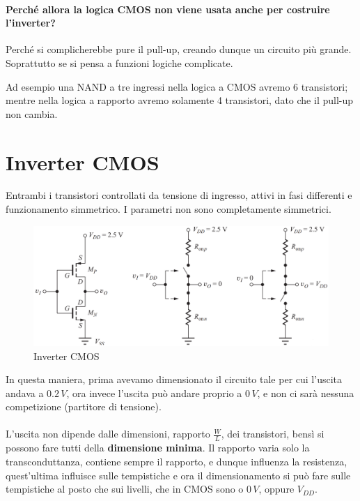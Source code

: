 \paragraph{Perché allora la logica CMOS non viene usata anche per costruire l'inverter?} Perché si complicherebbe pure il pull-up, creando dunque un circuito più grande. Soprattutto se si pensa a funzioni logiche complicate.

Ad esempio una NAND a tre ingressi nella logica a CMOS avremo 6 transistori; mentre nella logica a rapporto avremo solamente 4 transistori, dato che il pull-up non cambia.

\newpage
\section{Inverter CMOS}

Entrambi i transistori controllati da	tensione di	ingresso, attivi in fasi differenti e funzionamento simmetrico. I parametri non sono completamente simmetrici.


\begin{figure}[htbp]
    \centering
    \includegraphics[width=0.65\linewidth]{img/inveerrter_CMOS.png}
    \caption{Inverter CMOS}
    \label{Inverter_cmos}
\end{figure}

In questa maniera, prima avevamo dimensionato il circuito tale per cui l'uscita andava a $0.2\,V$, ora invece l'uscita può andare proprio a $0\,V$, e non ci sarà nessuna competizione (partitore di tensione).

\paragraph{}
L'uscita non dipende dalle dimensioni, rapporto $\frac{W}{L}$, dei transistori, bensì si possono fare tutti della \textbf{dimensione minima}. Il rapporto varia solo la transconduttanza, contiene sempre il rapporto, e dunque influenza la resistenza, quest'ultima influisce sulle tempistiche e ora il dimensionamento si può fare sulle tempistiche al posto che sui livelli, che in CMOS sono o $0\,V$, oppure $V_{DD}$.

